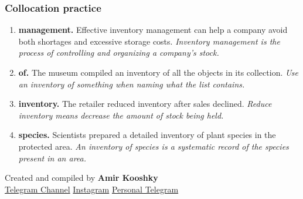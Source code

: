 \documentclass[11pt]{article}
\begin{document}
\subsubsection{Collocation practice}
\begin{enumerate}
  \item \textbf{management.} Effective inventory management can help a company avoid both shortages and excessive storage costs. \emph{Inventory management is the process of controlling and organizing a company's stock.}
  \item \textbf{of.} The museum compiled an inventory of all the objects in its collection. \emph{Use an inventory of something when naming what the list contains.}
  \item \textbf{inventory.} The retailer reduced inventory after sales declined. \emph{Reduce inventory means decrease the amount of stock being held.}
  \item \textbf{species.} Scientists prepared a detailed inventory of plant species in the protected area. \emph{An inventory of species is a systematic record of the species present in an area.}
\end{enumerate}

\vfill
\begin{center}
\small\color{Muted} Created and compiled by \textbf{Amir Kooshky}\\
\href{https://t.me/KooshkyTOEFL}{Telegram Channel}\quad\textbullet\quad
\href{https://www.instagram.com/kooshkytoefl}{Instagram}\quad\textbullet\quad
\href{https://t.me/KooshkyTOEFL\_pv}{Personal Telegram}
\end{center}
\end{document}
